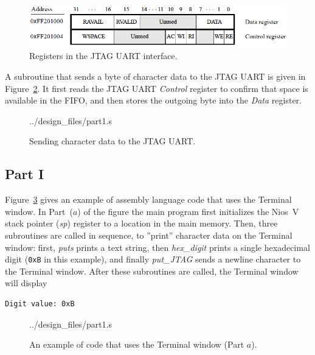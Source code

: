 \documentclass[epsfig,10pt,fullpage]{article}
\begin{document}
~\\
\begin{figure}[h]
	\begin{center}
	\includegraphics[scale=0.55]{figures/figureJTAG.png}
	\end{center}
	\caption{Registers in the JTAG UART interface.}
\label{fig:jtag_port}
\end{figure}

A subroutine that sends a byte of character data to the JTAG UART is given in 
Figure~\ref{fig:JTAG}.  It first reads the JTAG UART {\it Control} register to confirm that
space is available in the FIFO, and then stores the outgoing byte into the {\it Data} register.

\begin{figure}[]
\begin{center}

{../design_files/part1.s}
\end{center}
\caption{Sending character data to the JTAG UART.}
\label{fig:JTAG}
\end{figure}

\subsection*{Part I}

Figure~\ref{fig:part1} gives an example of assembly language code that uses the Terminal
window. In Part~($a$) of the figure the main program first initializes the Nios~V stack
pointer ({\it sp}) register to a location in the main memory.  
Then, three subroutines are called in sequence, 
to ''print'' character data on the Terminal window: first, {\it puts} prints a text string,
then {\it hex\_digit} prints a single hexadecimal digit (\texttt{0xB} in this example),
and finally {\it put\_JTAG} sends a newline character to the Terminal window. After these
subroutines are called, the Terminal window will display

\begin{verbatim}
Digit value: 0xB
\end{verbatim}

\newpage
\begin{figure}[bh]
\begin{center}

{../design_files/part1.s}
\end{center}
\caption{An example of code that uses the Terminal window (Part $a$).}
\label{fig:part1}
\end{figure}
\end{document}
